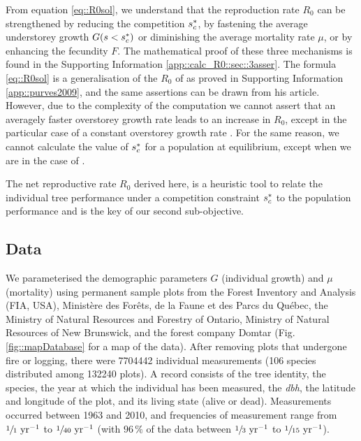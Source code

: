 From equation \eqref{eq::R0sol}, we understand that the reproduction rate $
R_0 $ can be strengthened by reducing the competition $ {s}^{*}_c $, by fastening
the average understorey growth $ G(s < {s}^{*}_c) $ or diminishing the average
mortality rate $ \mu $, or by enhancing the fecundity $ F $. The mathematical
proof of these three mechanisms is found in the Supporting Information
\ref{app::calc_R0::sec::3asser}. The formula \eqref{eq::R0sol} is a generalisation of the $ R_0 $ of \citet{Purves2009} as proved in Supporting Information \ref{app::purves2009}, and the same assertions can be drawn from his article. However, due to the complexity of the computation we cannot assert that an averagely faster overstorey growth rate leads to an increase in $ R_0 $, except in the particular case of a constant overstorey growth rate \citep{Purves2009}. For the same reason, we cannot calculate the value of $ {s}^{*}_c $ for a population at equilibrium, except when we are in the case of \citet[Supporting Information \ref{app::purves2009} for the proof]{Purves2009}.

The net reproductive rate $ R_0 $ derived here, is a heuristic tool to relate
the individual tree performance under a competition constraint $ {s}^{*}_c $ to the population performance and is the key of our second sub-objective.

\subsection{Data}

We parameterised the demographic parameters $ G $ (individual growth) and $ \mu $ (mortality) using permanent
sample plots from the Forest Inventory and Analysis (FIA, USA),
Ministère des Forêts, de la Faune et des Parcs du Québec, the Ministry of
Natural Resources and Forestry of Ontario, Ministry of Natural Resources of
New Brunswick, and the forest company Domtar (Fig. \ref{fig::mapDatabase}
for a map of the data). After removing plots that
undergone fire or logging, there were \num{7704442} individual measurements (106 species distributed
among \num{132240} plots). A record consists of the
tree identity, the species, the year at which the individual has been
measured, the \textit{dbh}, the latitude and longitude of the plot, and its
living state (alive or dead). Measurements occurred between 1963 and 2010, and frequencies of measurement range from
$ \sfrac{1}{1} \text{ yr}^{-1} $ to $ \sfrac{1}{40} \text{ yr}^{-1} $ (with $ 96 \, \% $ of the data between $ \sfrac{1}{3} \text{ yr}^{-1} $ to
$ \sfrac{1}{15} \text{ yr}^{-1} $).

